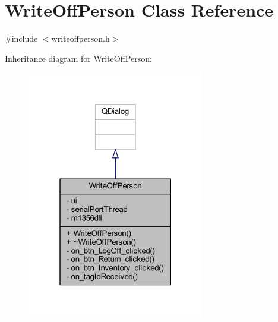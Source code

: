 \hypertarget{class_write_off_person}{}\section{Write\+Off\+Person Class Reference}
\label{class_write_off_person}


{\ttfamily \#include $<$writeoffperson.\+h$>$}



Inheritance diagram for Write\+Off\+Person\+:
\nopagebreak
\begin{figure}[H]
\begin{center}
\leavevmode
\includegraphics[width=220pt]{class_write_off_person__inherit__graph}
\end{center}
\end{figure}


